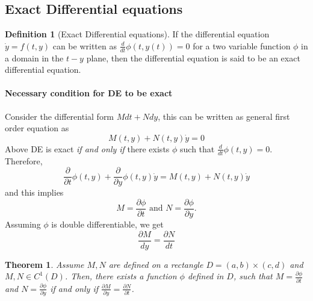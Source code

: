 \documentclass[12pt,reqno]{amsart}
\theoremstyle{plain}
\newtheorem{thm}{Theorem}
\theoremstyle{definition}
\newtheorem{defn}{Definition}
\begin{document}
\subsection{Exact Differential equations}
\begin{defn}[Exact Differential equations]
    If the differential equation $ \dot{y} = f(t, y)$ can be written as $\frac{d}{dt}\phi(t,y(t)) = 0$ for a two variable function $\phi$ in a domain in the $t-y$ plane, then the differential equation is said to be an exact differential equation.
\end{defn}
\paragraph{\bf Necessary condition for DE to be exact}
Consider the differential form $Mdt + Ndy$, this can be written as general first order equation as
$$ M(t,y) + N(t,y) \dot{y} = 0$$
Above DE is exact {\it if and only if} there exists $\phi$ such that $\frac{d}{dt}\phi(t,y) = 0$. Therefore,
$$ \frac{\partial}{\partial t}\phi(t,y) + \frac{\partial}{\partial y}\phi(t,y)\dot{y} = M(t,y) + N(t,y) \dot{y} $$ and this implies 
$$ M = \frac{\partial \phi}{\partial t} \text{ and } N = \frac{\partial \phi}{\partial y}.$$
Assuming $\phi$ is double differentiable, we get 
$$ \frac{\partial M}{dy} = \frac{\partial N}{dt}$$
\begin{thm}
    Assume $M,N$ are defined on a rectangle $D = (a,b) \times (c,d)$ and $M,N \in C^1(D)$. Then, there exists a function $\phi$ defined in $D$, such that $M = \frac{\partial \phi}{\partial t}$ and $N = \frac{\partial \phi}{\partial y}$ if and only if $\frac{\partial M}{\partial y} = \frac{\partial N}{\partial t}$.
\end{thm}
\end{document}
